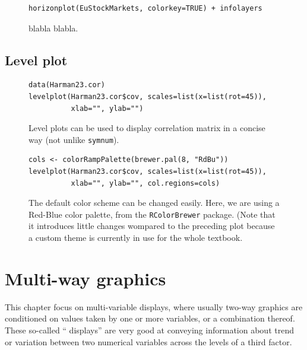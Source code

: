 \documentclass[a4paper,twoside]{book}
\newcounter{fig}
\newcommand{\img}[1]{\texttt{[image: \#1]}\stepcounter{fig}}
\renewcommand{\texttt}[1]{\lstinline{#1}}
\begin{document}
\begin{figure}[H]
\begin{lstlisting}
horizonplot(EuStockMarkets, colorkey=TRUE) + infolayers
\end{lstlisting}
  \fcapside[\FBwidth] {\img{figs_lattice-crop}}
  {\caption*{blabla blabla.}}
\end{figure}

\section{Level plot}

\begin{figure}[H]
\begin{lstlisting}
data(Harman23.cor)
levelplot(Harman23.cor$cov, scales=list(x=list(rot=45)), 
          xlab="", ylab="")
\end{lstlisting}
  \fcapside[\FBwidth] {\img{figs_lattice-crop}}
  {\caption*{ Level plots can be used to
      display correlation matrix in a concise way (not unlike
      \texttt{symnum}).}} 
\end{figure}

\begin{figure}[H]
\begin{lstlisting}
cols <- colorRampPalette(brewer.pal(8, "RdBu"))
levelplot(Harman23.cor$cov, scales=list(x=list(rot=45)), 
          xlab="", ylab="", col.regions=cols)
\end{lstlisting}
  \fcapside[\FBwidth] {\img{figs_lattice-crop}}
  {\caption*{The default color scheme can be changed easily. Here,
      we are using a Red-Blue color palette, from the
      \texttt{RColorBrewer} package. (Note that it introduces little
      changes wompared to the preceding plot because a custom theme is
    currently in use for the whole textbook.}} 
\end{figure}

\chapter{Multi-way graphics}

This chapter focus on multi-variable displays, where usually two-way
graphics are conditioned on values taken by one or more variables, or
a combination thereof. These so-called `` displays'' are very
good at conveying information about trend or variation between two
numerical variables across the levels of a third factor.
\end{document}
